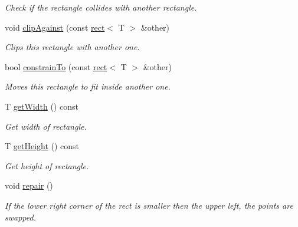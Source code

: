 \begin{DoxyCompactItemize}
\begin{DoxyCompactList}\small\item\em Check if the rectangle collides with another rectangle. \end{DoxyCompactList}\item 
void \hyperlink{classirr_1_1core_1_1rect_a86645d45a8bed1a3539bba9865e93de4}{clip\+Against} (const \hyperlink{classirr_1_1core_1_1rect}{rect}$<$ T $>$ \&other)
\begin{DoxyCompactList}\small\item\em Clips this rectangle with another one. \end{DoxyCompactList}\item 
bool \hyperlink{classirr_1_1core_1_1rect_a4515d2a1349dc805775854a422465f63}{constrain\+To} (const \hyperlink{classirr_1_1core_1_1rect}{rect}$<$ T $>$ \&other)
\begin{DoxyCompactList}\small\item\em Moves this rectangle to fit inside another one. \end{DoxyCompactList}\item 
\mbox{\label{classirr_1_1core_1_1rect_ad5dcae186b85b938d42b59c91bfeb9a5}} 
T \hyperlink{classirr_1_1core_1_1rect_ad5dcae186b85b938d42b59c91bfeb9a5}{get\+Width} () const
\begin{DoxyCompactList}\small\item\em Get width of rectangle. \end{DoxyCompactList}\item 
\mbox{\label{classirr_1_1core_1_1rect_ad43b325eeb165c553a58f34efb2ee961}} 
T \hyperlink{classirr_1_1core_1_1rect_ad43b325eeb165c553a58f34efb2ee961}{get\+Height} () const
\begin{DoxyCompactList}\small\item\em Get height of rectangle. \end{DoxyCompactList}\item 
\mbox{\label{classirr_1_1core_1_1rect_a45c7665e74aed626bb5c01729f206775}} 
void \hyperlink{classirr_1_1core_1_1rect_a45c7665e74aed626bb5c01729f206775}{repair} ()
\begin{DoxyCompactList}\small\item\em If the lower right corner of the rect is smaller then the upper left, the points are swapped. \end{DoxyCompactList}\item 

\end{DoxyCompactItemize}
